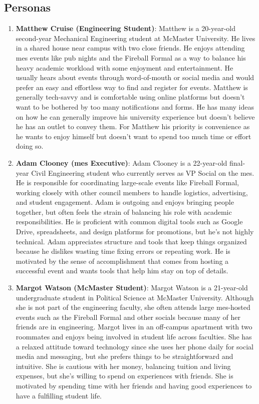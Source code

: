 \documentclass[12pt]{article}
\begin{document}
\subsection{Personas}
\begin{enumerate}
  \item \textbf{Matthew Cruise (Engineering Student)}: Matthew is a 20-year-old second-year Mechanical Engineering
    student at McMaster University. He lives in a shared house near campus with two close friends. He enjoys attending
    \gls{mes} events like pub nights and the Fireball Formal as a way to balance his heavy academic workload with some
    enjoyment and entertainment. He usually hears about events through word-of-mouth or social media and would prefer an
    easy and effortless way to find and register for events. Matthew is generally tech-savvy and is comfortable using
    online platforms but doesn't want to be bothered by too many notifications and forms. He has many ideas on how he
    can generally improve his university experience but doesn't believe he has an outlet to convey them. For Matthew his
    priority is convenience as he wants to enjoy himself but doesn't want to spend too much time or effort doing so.
  \item \textbf{Adam Clooney (\gls{mes} Executive)}: Adam Clooney is a 22-year-old final-year Civil Engineering student
    who currently serves as VP Social on the \gls{mes}. He is responsible for coordinating large-scale events like
    Fireball Formal, working closely with other council members to handle logistics, advertising, and student
    engagement. Adam is outgoing and enjoys bringing people together, but often feels the strain of balancing his role
    with academic responsibilities. He is proficient with common digital tools such as Google Drive, spreadsheets, and
    design platforms for promotions, but he’s not highly technical. Adam appreciates structure and tools that keep
    things organized because he dislikes wasting time fixing errors or repeating work. He is motivated by the sense of
    accomplishment that comes from hosting a successful event and wants tools that help him stay on top of details.
  \item \textbf{Margot Watson (McMaster Student)}: Margot Watson is a 21-year-old undergraduate student in Political
    Science at McMaster University. Although she is not part of the engineering faculty, she often attends large
    \gls{mes}-hosted events such as the Fireball Formal and other socials because many of her friends are in
    engineering. Margot lives in an off-campus apartment with two roommates and enjoys being involved in student life
    across faculties. She has a relaxed attitude toward technology since she uses her phone daily for social media and
    messaging, but she prefers things to be straightforward and intuitive. She is cautious with her money, balancing
    tuition and living expenses, but she’s willing to spend on experiences with friends. She is motivated by spending
    time with her friends and having good experiences to have a fulfilling student life.
\end{enumerate}
\end{document}
